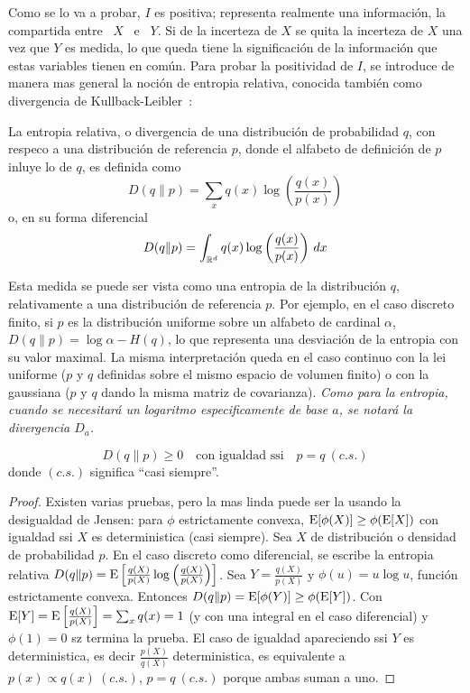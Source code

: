 Como se lo va a probar, $I$ es positiva; representa realmente una informaci\'on,
la compartida  entre \ $X$  \ e  \ $Y$. Si  de la incerteza  de $X$ se  quita la
incerteza  de  $X$   una  vez  que  $Y$  es  medida,  lo   que  queda  tiene  la
significaci\'on de la informaci\'on que  estas variables tienen en com\'un. Para
probar la positividad de $I$, se  introduce de manera mas general la noci\'on de
entropia     relativa,     conocida     tambi\'en    como     divergencia     de
Kullback-Leibler~\cite{CovTho06, Rio07, Kul}:
%
%
\begin{definicion}\label{def:SZ:entropiarelativa}
  La entropia relativa, o divergencia de una distribuci\'on de probabilidad $q$,
  con  respeco a  una distribuci\'on  de referencia  $p$, donde  el  alfabeto de
  definici\'on de $p$ inluye lo de $q$, es definida como
  \[
  D(q\|p) = \sum_x q(x) \log \left( \frac{q(x)}{p(x)} \right)
  \]
 o, en su forma diferencial
 \[
 D(q\|p) = \int_{\mathbb{R}^d} q(x) \log \left( \frac{q(x)}{p(x)} \right) \, dx
 \]
\end{definicion}
%
Esta  medida se  puede ser  vista como  una entropia  de la  distribuci\'on $q$,
relativamente a  una distribuci\'on de referencia  $p$. Por ejemplo,  en el caso
discreto  finito, si  $p$ es  la distribuci\'on  uniforme sobre  un  alfabeto de
cardinal  $\alpha$,  $D(q\|p) =  \log  \alpha -  H(q)$,  lo  que representa  una
desviaci\'on  de la  entropia con  su valor  maximal. La  misma interpretaci\'on
queda en  el caso continuo  con la  lei uniforme ($p$  y $q$ definidas  sobre el
mismo espacio de  volumen finito) o con  la gaussiana ($p$ y $q$  dando la misma
matriz de  covarianza). {\it  Como para la  entropia, cuando se  necesitar\'a un
  logaritmo especificamente de base $a$, se notar\'a la divergencia $D_a$.}

\begin{lema}
  \[
  D(q\|p) \ge 0 \quad \mbox{con igualdad ssi} \quad p = q \: (c.s.)
  \]
  donde $(c.s.)$ significa ``casi siempre''.
\end{lema}
%
\begin{proof}
  Existen varias pruebas,  pero la mas linda puede ser  la usando la desigualdad
  de   Jensen:   para   $\phi$   estrictamente   convexa,   $\operatorname{E}[\phi(X)]   \ge
  \phi(\operatorname{E}[X])$ con igualdad ssi $X$  es deterministica (casi siempre). Sea $X$
  de distribuci\'on  o densidad  de probabilidad $p$.  En el caso  discreto como
  diferencial,   se  escribe   la  entropia   relativa  $D(q\|p)   =  \operatorname{E}\left[
    \frac{q(X)}{p(X)} \log  \left( \frac{q(X)}{p(X)} \right) \right]$.  Sea $Y =
  \frac{q(X)}{p(X)}$   y  $\phi(u)   =  u   \log  u$,   funci\'on  estrictamente
  convexa. Entonces $D(q\|p) =  \operatorname{E}[\phi(Y)] \ge \phi(\operatorname{E}[Y])$. Con $\operatorname{E}[Y] =
  \operatorname{E}\left[ \frac{q(X)}{p(X)} \right] = \sum_x q(x) = 1$ (y con una integral en
  el caso diferencial) y $\phi(1) = 0$ sz termina la prueba. El caso de igualdad
  apareciendo   ssi  $Y$   es  deterministica,   es   decir  $\frac{p(X)}{q(X)}$
  deterministica, es equivalente a $p(x) \propto  q(x) \: (c.s.)$, \ie $p = q \:
  (c.s.)$ porque ambas suman a uno.
\end{proof}


